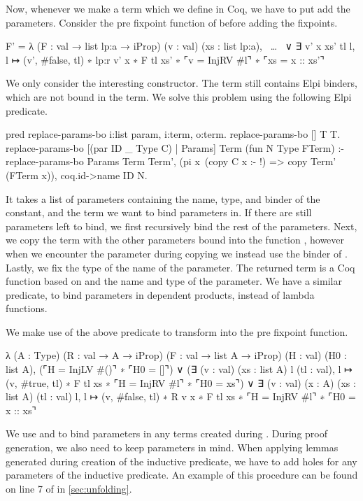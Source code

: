 \documentclass[thesis.tex]{subfiles}
\begin{document}
{Now, whenever we make a term which we define in Coq, we have to put add the parameters. Consider the pre fixpoint function of  before adding the fixpoints.
\begin{elpicode}
  F' = {{
    λ (F : val → list lp:a → iProp) 
      (v : val) (xs : list lp:a),
      ~\ldots~
    ∨ ∃ v' x xs' tl l, 
        l ↦ (v', #false, tl) ∗ lp:r v' x ∗ F tl xs' ∗ 
        ⌜v = InjRV #l⌝ ∗ ⌜xs = x :: xs'⌝
  }}
\end{elpicode}
We only consider the interesting constructor. The term still contains Elpi binders, which are not bound in the term. We solve this problem using the following Elpi predicate.
\begin{elpicode}
  pred replace-params-bo i:list param, i:term, o:term.
  replace-params-bo [] T T.
  replace-params-bo [(par ID _ Type C) | Params] 
                    Term (fun N Type FTerm) :-
    replace-params-bo Params Term Term',
    (pi x\ (copy C x :- !) => copy Term' (FTerm x)),
    coq.id->name ID N.
\end{elpicode}
It takes a list of parameters containing the name, type, and binder of the constant, and the term we want to bind parameters in. If there are still parameters left to bind, we first recursively bind the rest of the parameters. Next, we copy the term with the other parameters bound into the function , however when we encounter the parameter during copying we instead use the binder of . Lastly, we fix the type of the name of the parameter. The returned term is a Coq function based on  and the name and type of the parameter. We have a similar predicate,  to bind parameters in dependent products, instead of lambda functions.

We make use of the above predicate to transform  into the pre fixpoint function.
\begin{coqcode}
  λ (A : Type) (R : val → A → iProp) 
    (F : val → list A → iProp) 
    (H : val) (H0 : list A),
      (⌜H = InjLV #()⌝ ∗ ⌜H0 = []⌝)
    ∨ (∃ (v : val) (xs : list A) l (tl : val), 
         l ↦ (v, #true, tl) ∗ F tl xs ∗ 
         ⌜H = InjRV #l⌝ ∗ ⌜H0 = xs⌝)
    ∨ ∃ (v : val) (x : A) (xs : list A) (tl : val) l, 
        l ↦ (v, #false, tl) ∗ R v x ∗ F tl xs ∗ 
        ⌜H = InjRV #l⌝ ∗ ⌜H0 = x :: xs⌝
\end{coqcode}

We use  and  to bind parameters in any terms created during . During proof generation, we also need to keep parameters in mind. When applying lemmas generated during creation of the inductive predicate, we have to add holes for any parameters of the inductive predicate. An example of this procedure can be found on line 7 of  in \cref{sec:unfolding}.

}
\end{document}
